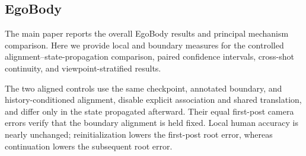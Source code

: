 \FloatBarrier
\subsection{EgoBody}
\label{app:egobody-details}

The main paper reports the overall EgoBody results and principal mechanism
comparison. Here we provide local and boundary measures for the controlled
alignment--state-propagation comparison, paired confidence intervals, cross-shot
continuity, and viewpoint-stratified results.

The two aligned controls use the same checkpoint, annotated boundary, and
history-conditioned alignment, disable explicit association and shared
translation, and differ only in the state propagated afterward. Their equal
first-post camera errors verify that the boundary alignment is held fixed.
Local human accuracy is nearly unchanged; reinitialization lowers the
first-post root error, whereas continuation lowers the subsequent root error.

\begin{table}[t]
  \centering
  \caption{Local and boundary measures when varying the state propagated after
  alignment on EgoBody. Human errors are in mm, camera rotation in degrees, and the
  remaining camera/root errors in m.}
  \label{tab:supp-egobody-alignment-state}
  \small
  \resizebox{0.88\textwidth}{!}{}
\end{table}

\begin{table}[t]
  \centering
  \caption{Paired Human3R--Shot3R analysis over 43 EgoBody recordings. The
  interval is a paired bootstrap and positive gain favours Shot3R.}
  \label{tab:supp-egobody-paired}
  \small
  
\end{table}

